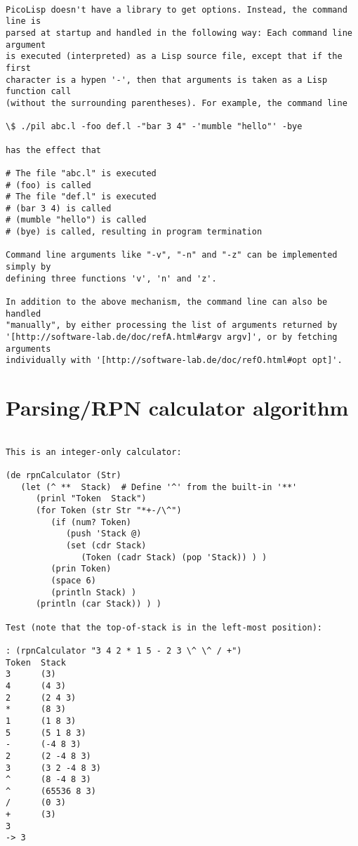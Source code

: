 \begin{verbatim}

PicoLisp doesn't have a library to get options. Instead, the command line is
parsed at startup and handled in the following way: Each command line argument
is executed (interpreted) as a Lisp source file, except that if the first
character is a hypen '-', then that arguments is taken as a Lisp function call
(without the surrounding parentheses). For example, the command line

\$ ./pil abc.l -foo def.l -"bar 3 4" -'mumble "hello"' -bye

has the effect that

# The file "abc.l" is executed
# (foo) is called
# The file "def.l" is executed
# (bar 3 4) is called
# (mumble "hello") is called
# (bye) is called, resulting in program termination

Command line arguments like "-v", "-n" and "-z" can be implemented simply by
defining three functions 'v', 'n' and 'z'.

In addition to the above mechanism, the command line can also be handled
"manually", by either processing the list of arguments returned by
'[http://software-lab.de/doc/refA.html#argv argv]', or by fetching arguments
individually with '[http://software-lab.de/doc/refO.html#opt opt]'.

\end{verbatim}

\section*{Parsing/RPN calculator algorithm}

\begin{verbatim}

This is an integer-only calculator:

(de rpnCalculator (Str)
   (let (^ **  Stack)  # Define '^' from the built-in '**'
      (prinl "Token  Stack")
      (for Token (str Str "*+-/\^")
         (if (num? Token)
            (push 'Stack @)
            (set (cdr Stack)
               (Token (cadr Stack) (pop 'Stack)) ) )
         (prin Token)
         (space 6)
         (println Stack) )
      (println (car Stack)) ) )

Test (note that the top-of-stack is in the left-most position):

: (rpnCalculator "3 4 2 * 1 5 - 2 3 \^ \^ / +")
Token  Stack
3      (3)
4      (4 3)
2      (2 4 3)
*      (8 3)
1      (1 8 3)
5      (5 1 8 3)
-      (-4 8 3)
2      (2 -4 8 3)
3      (3 2 -4 8 3)
^      (8 -4 8 3)
^      (65536 8 3)
/      (0 3)
+      (3)
3
-> 3

\end{verbatim}

